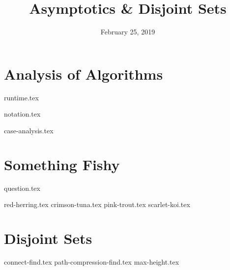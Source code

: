 \documentclass[11pt]{exam}
\title{Asymptotics \& Disjoint Sets}
\date{February 25, 2019}
\begin{document}
\maketitle

\section{Analysis of Algorithms}
{runtime.tex}
\begin{questions}

{notation.tex}

{case-analysis.tex}
\end{questions}

\clearpage

\section{Something Fishy}
{question.tex}
\begin{questions}
{red-herring.tex}
{crimson-tuna.tex}
{pink-trout.tex}
{scarlet-koi.tex}
\end{questions}

\clearpage
\section{Disjoint Sets}
\begin{questions}
{connect-find.tex}
{path-compression-find.tex}
{max-height.tex}
\end{questions}

\clearpage
\end{document}
